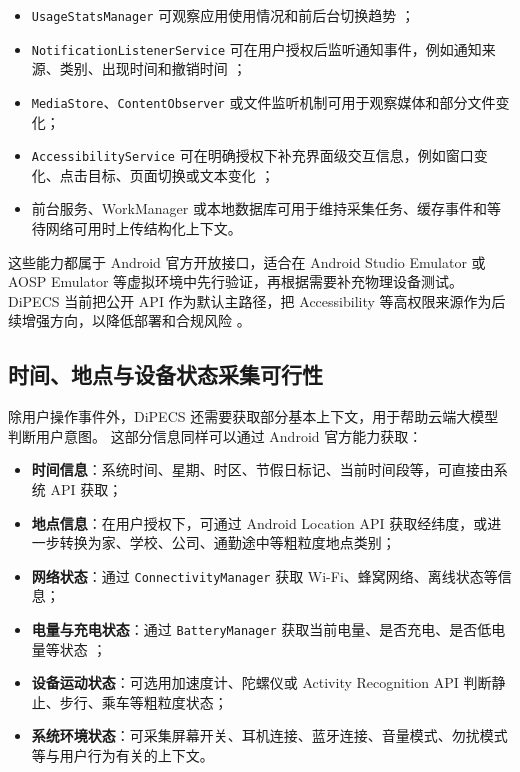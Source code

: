 \documentclass[12pt,a4paper]{article}
\begin{document}
\begin{itemize}
  \item \texttt{UsageStatsManager} 可观察应用使用情况和前后台切换趋势 \cite{android-usagestats}；
  \item \texttt{NotificationListenerService} 可在用户授权后监听通知事件，例如通知来源、类别、出现时间和撤销时间 \cite{android-notification}；
  \item \texttt{MediaStore}、\texttt{ContentObserver} 或文件监听机制可用于观察媒体和部分文件变化；
  \item \texttt{AccessibilityService} 可在明确授权下补充界面级交互信息，例如窗口变化、点击目标、页面切换或文本变化 \cite{android-accessibility}；
  \item 前台服务、WorkManager 或本地数据库可用于维持采集任务、缓存事件和等待网络可用时上传结构化上下文。
\end{itemize}

这些能力都属于 Android 官方开放接口，适合在 Android Studio Emulator 或 AOSP Emulator 等虚拟环境中先行验证，再根据需要补充物理设备测试。
DiPECS 当前把公开 API 作为默认主路径，把 Accessibility 等高权限来源作为后续增强方向，以降低部署和合规风险 \cite{google-play-accessibility}。

\subsection{时间、地点与设备状态采集可行性}\label{subsec:context-collection}

除用户操作事件外，DiPECS 还需要获取部分基本上下文，用于帮助云端大模型判断用户意图。
这部分信息同样可以通过 Android 官方能力获取：

\begin{itemize}
  \item \textbf{时间信息}：系统时间、星期、时区、节假日标记、当前时间段等，可直接由系统 API 获取；
  \item \textbf{地点信息}：在用户授权下，可通过 Android Location API 获取经纬度，或进一步转换为家、学校、公司、通勤途中等粗粒度地点类别；
  \item \textbf{网络状态}：通过 \texttt{ConnectivityManager} 获取 Wi-Fi、蜂窝网络、离线状态等信息；
  \item \textbf{电量与充电状态}：通过 \texttt{BatteryManager} 获取当前电量、是否充电、是否低电量等状态 \cite{android-battery}；
  \item \textbf{设备运动状态}：可选用加速度计、陀螺仪或 Activity Recognition API 判断静止、步行、乘车等粗粒度状态；
  \item \textbf{系统环境状态}：可采集屏幕开关、耳机连接、蓝牙连接、音量模式、勿扰模式等与用户行为有关的上下文。
\end{itemize}
\end{document}
